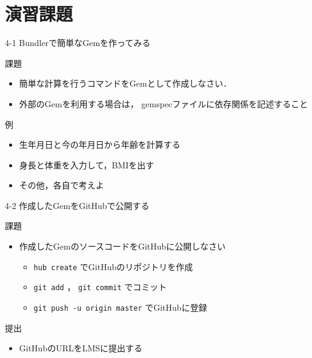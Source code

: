 \documentclass[t, aspectratio=169]{beamer}
\begin{document}
\section{演習課題}
\label{sec-4-4}
\begin{frame}[label=sec-4-4-1]{4-1 Bundlerで簡単なGemを作ってみる}
\begin{block}{課題}
\begin{itemize}
\item 簡単な計算を行うコマンドをGemとして作成しなさい．
\item 外部のGemを利用する場合は，
gemspecファイルに依存関係を記述すること
\end{itemize}
\end{block}
\begin{block}{例}
\begin{itemize}
\item 生年月日と今の年月日から年齢を計算する
\item 身長と体重を入力して，BMIを出す
\item その他，各自で考えよ
\end{itemize}
\end{block}
\end{frame}
\begin{frame}[fragile,label=sec-4-4-2]{4-2 作成したGemをGitHubで公開する}
 \begin{block}{課題}
\begin{itemize}
\item 作成したGemのソースコードをGitHubに公開しなさい
\begin{itemize}
\item \texttt{hub create} でGitHubのリポジトリを作成
\item \texttt{git add} ， \texttt{git commit} でコミット
\item \texttt{git push -u origin master} でGitHubに登録
\end{itemize}
\end{itemize}
\end{block}
\begin{block}{提出}
\begin{itemize}
\item GitHubのURLをLMSに提出する
\end{itemize}
\end{block}
\end{frame}
\end{document}
